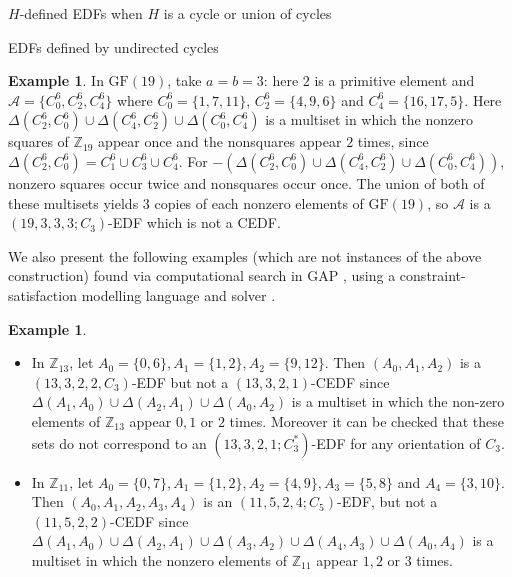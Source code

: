 \documentclass[12pt, a4paper]{article}
\theoremstyle{definition}
\newtheorem{example}[theorem]{Example}
\begin{document}
\begin{section}{$H$-defined EDFs when $H$ is a cycle or union of cycles}
\begin{subsection}{EDFs defined by undirected cycles}
\begin{example}
In $\mathrm{GF}(19)$, take $a=b=3$: here $2$ is a primitive element and $\mathcal{A}=\{C_0^6,C_2^6,C_4^6\}$ where $C_0^6=\{1,7,11\}$, $C_2^6=\{4,9,6\}$ and $C_4^6=\{16,17,5\}$.  Here $\Delta(C_2^6,C_0^6) \cup \Delta(C_4^6,C_2^6) \cup \Delta(C_0^6,C_4^6)$ is a multiset in which the nonzero squares of $\mathbb{Z}_{19}$ appear once and the nonsquares appear $2$ times, since  $\Delta(C_2^6,C_0^6)=C_1^6 \cup C_3^6 \cup C_4^6$. For $-(\Delta(C_2^6,C_0^6) \cup \Delta(C_4^6,C_2^6) \cup \Delta(C_0^6,C_4^6))$, nonzero squares occur twice and nonsquares occur once.  The union of both of these multisets yields $3$ copies of each nonzero elements of $\mathrm{GF}(19)$, so $\mathcal{A}$ is a $(19,3,3,3;C_3)$-EDF which is not a CEDF.
\end{example}

We also present the following examples (which are not instances of the above construction) found via computational search in GAP \cite{GAP}, using a constraint-satisfaction modelling language \cite{Akg} and solver \cite{GenJefMig}.

\begin{example}
\begin{itemize}
\item[(i)] In $\mathbb{Z}_{13}$, let $A_0=\{0,6\}, A_1=\{1,2\}, A_2=\{9,12\}$.  Then $(A_0,A_1,A_2)$ is a $(13,3,2,2, C_3)$-EDF but not a $(13,3,2,1)$-CEDF since $\Delta(A_1,A_0) \cup \Delta(A_2,A_1) \cup \Delta(A_0,A_2)$ is a multiset in which the non-zero elements of $\mathbb{Z}_{13}$ appear $0,1$ or $2$ times.  Moreover it can be checked that these sets do not correspond to an $(13,3,2,1;C_3^*)$-EDF for any orientation of $C_3$. 
\item[(ii)] In $\mathbb{Z}_{11}$, let $A_0=\{0,7\}, A_1=\{1,2\}, A_2=\{4,9\}, A_3=\{5,8\}$ and $A_4=\{3,10\}$.  Then $(A_0,A_1,A_2,A_3,A_4)$ is an $(11,5,2,4; C_5)$-EDF, but not a $(11,5,2,2)$-CEDF since $\Delta(A_1,A_0) \cup \Delta(A_2,A_1) \cup \Delta(A_3,A_2) \cup \Delta(A_4,A_3) \cup \Delta(A_0,A_4)$ is a multiset in which the nonzero elements of $\mathbb{Z}_{11}$ appear $1,2$ or $3$ times.  
\end{itemize}
\end{example}

\end{subsection}


\end{section}
\end{document}
